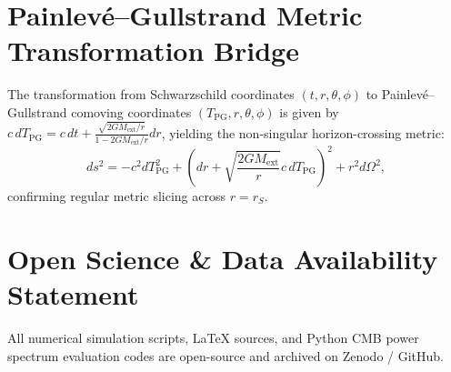 \documentclass[11pt,a4paper]{article}
\begin{document}
\appendix
\section{Painlev\'e--Gullstrand Metric Transformation Bridge}\label{sec:pg_bridge}
The transformation from Schwarzschild coordinates $(t, r, \theta, \phi)$ to Painlev\'e--Gullstrand comoving coordinates $(T_{\text{PG}}, r, \theta, \phi)$ is given by $c\,dT_{\text{PG}} = c\,dt + \frac{\sqrt{2GM_{\text{ext}}/r}}{1 - 2GM_{\text{ext}}/r} dr$, yielding the non-singular horizon-crossing metric:
\begin{equation}\label{eq:pg_metric}
    ds^2 = -c^2 dT_{\text{PG}}^2 + \left( dr + \sqrt{\frac{2GM_{\text{ext}}}{r}} c\,dT_{\text{PG}} \right)^2 + r^2 d\Omega^2,
\end{equation}
confirming regular metric slicing across $r = r_S$.

\section{Open Science \& Data Availability Statement}\label{sec:open_science}
All numerical simulation scripts, LaTeX sources, and Python CMB power spectrum evaluation codes are open-source and archived on Zenodo / GitHub.
\end{document}
